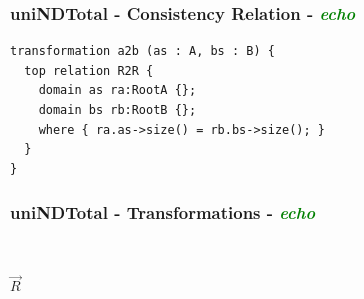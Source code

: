 \documentclass{beamer}
\begin{document}
\begin{frame}[fragile]
\frametitle{uniNDTotal - \textbf{Consistency Relation} - \textbf{\textit{\textcolor{green}{echo}}}}

\begin{lstlisting}[language=QVT]
transformation a2b (as : A, bs : B) {
  top relation R2R { 
    domain as ra:RootA {};
    domain bs rb:RootB {};
    where { ra.as->size() = rb.bs->size(); }
  }
}
\end{lstlisting}



\end{frame}


\begin{frame}
\frametitle{uniNDTotal - \textbf{Transformations} - \textbf{\textit{\textcolor{green}{echo}}}}
\begin{figure}[ht]
    \centering
    \mbox{\qquad\qquad\qquad
          }
    \label{fig:T1}
\end{figure}

\begin{center}
$\overrightarrow{R}$
\end{center}

\begin{figure}[ht]
    \centering
    \mbox{\qquad\qquad\qquad
          }
    \label{fig:T1}
\end{figure}


\end{frame}
\end{document}
